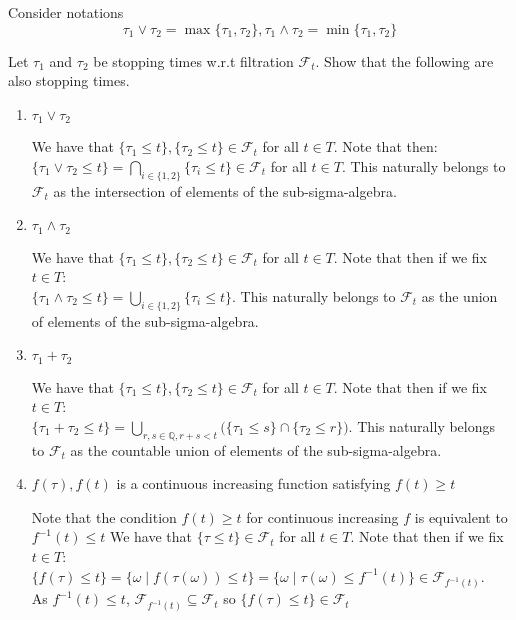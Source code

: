 \documentclass[12pt,twoside, letter]{exam}
\theoremstyle{definition}
\newcommand{\qq}{\mathbb{Q}}
\begin{document}
  \par{Consider notations}
  \begin{equation*}
    \tau_1 \vee \tau_2 = \max\{\tau_1, \tau_2\}, \tau_1 \wedge \tau_2 = \min\{\tau_1, \tau_2 \}
  \end{equation*}
  \par{Let $\tau_1$ and $\tau_2$ be stopping times w.r.t filtration $\mathcal{F}_t$. Show that
  the following are also stopping times.}
  \begin{enumerate}
    \item $\tau_1 \vee \tau_2$
      \begin{solution}
        We have that $\{\tau_1 \leq t\}, \{\tau_2 \leq t\} \in \mathcal{F}_t$ for all $t \in T$.
        Note that then: \\
        $\{\tau_1 \vee \tau_2 \leq t \} = \bigcap_{i \in \{1,2\}} \{\tau_{i} \leq t\} \in \mathcal{F}_t$
        for all $t \in T$.
        This naturally belongs to $\mathcal{F}_t$ as the intersection of elements of the sub-sigma-algebra.
      \end{solution}
    \item $\tau_1 \wedge \tau_2$
      \begin{solution}
        We have that $\{\tau_1 \leq t\}, \{\tau_2 \leq t\} \in \mathcal{F}_t$ for all $t \in T$.
        Note that then if we fix $t \in T$: \\
        $\{\tau_1 \wedge \tau_2 \leq t \} = \bigcup_{i \in \{1,2\}} \{\tau_{i} \leq t\}$.
        This naturally belongs to $\mathcal{F}_t$ as the union of elements of the sub-sigma-algebra.
      \end{solution}
    \item $\tau_1 + \tau_2$
      \begin{solution}
        We have that $\{\tau_1 \leq t\}, \{\tau_2 \leq t\} \in \mathcal{F}_t$ for all $t \in T$.
        Note that then if we fix $t \in T$: \\
        $\{\tau_1 + \tau_2 \leq t \} = \bigcup_{r,s \in \qq, r+s < t} \bigg( \{\tau_1 \leq s \} \cap \{\tau_2 \leq r \} \bigg)$.
        This naturally belongs to $\mathcal{F}_t$ as the countable union of elements of the sub-sigma-algebra.
      \end{solution}
    \item $f(\tau), f(t)$ is a continuous increasing function satisfying $f(t) \geq t$
      \begin{solution}
        Note that the condition $f(t) \geq t$ for continuous increasing $f$ is equivalent to $f^{-1}(t) \leq t$
        We have that $\{\tau \leq t\} \in \mathcal{F}_t$ for all $t \in T$.
        Note that then if we fix $t \in T$: \\
        $\{f(\tau) \leq t\} = \{\omega \mid f(\tau(\omega)) \leq t\} = \{\omega \mid \tau(\omega) \leq f^{-1}(t)\}
        \in \mathcal{F}_{f^{-1}(t)}$. \\
        As $f^{-1}(t) \leq t$, $\mathcal{F}_{f^{-1}(t)} \subseteq \mathcal{F}_{t}$ so
        $\{f(\tau) \leq t\} \in \mathcal{F}_{t}$
      \end{solution}
  \end{enumerate}
\end{document}
